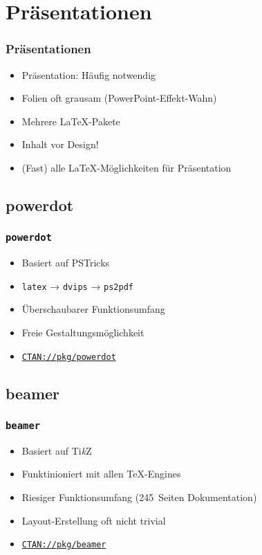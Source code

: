 \section{Pr\"asentationen}

\begin{frame}
  \frametitle{Präsentationen}
  \begin{itemize}
  \item Präsentation: Häufig notwendig
  \item Folien oft grausam (PowerPoint-Effekt-Wahn)
  \item Mehrere \LaTeX-Pakete
  \item Inhalt vor Design!
  \item (Fast) alle \LaTeX-Möglichkeiten für Präsentation
  \end{itemize}
  \begingroup
  \printbibliography[heading=none,keyword=presentation]
  \endgroup
\end{frame}

\subsection{powerdot}
\begin{frame}
  \frametitle{\texttt{powerdot}}
  \begin{itemize}
  \item Basiert auf PSTricks
  \item \texttt{latex} → \texttt{dvips} → \texttt{ps2pdf}
  \item Überschaubarer Funktionsumfang
  \item Freie Gestaltungsmöglichkeit
  \item \href{http://ctan.org/pkg/powerdot}{\texttt{CTAN://pkg/powerdot}}
  \end{itemize}
\end{frame}

\begin{frame}[fragile]
  \frametitle{\texttt{powerdot}}
  \framesubtitle{Code-Beispiel}
  TeX}]{examples/presentations/minimal-powerdot.tex}
\end{frame}

\subsection{beamer}
\begin{frame}
  \frametitle{\texttt{beamer}}
  \begin{itemize}
  \item Basiert auf Ti\emph{k}Z
  \item Funktinioniert mit allen \TeX-Engines
  \item Riesiger Funktionsumfang (245~Seiten Dokumentation)
  \item Layout-Erstellung oft nicht trivial
  \item \href{http://ctan.org/pkg/beamer}{\texttt{CTAN://pkg/beamer}}
  \end{itemize}
\end{frame}

